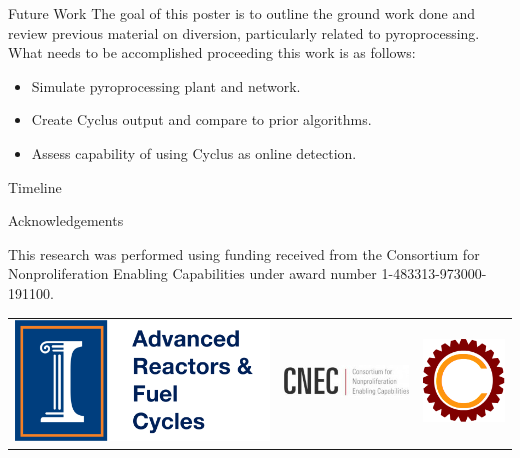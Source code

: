 \documentclass[final]{beamer}
\newlength{\onecolwid}
\newlength{\threecolwid}
\begin{document}
\begin{frame}[t]
\begin{columns}[t,totalwidth=\threecolwid]
\begin{column}{\onecolwid}
\begin{alertblock}{Future Work}
	The goal of this poster is to outline the ground work done and review previous material on diversion, particularly related
	to pyroprocessing. What needs to be accomplished proceeding this work is as follows:
	\begin{itemize}
		\item Simulate pyroprocessing plant and network.
		\item Create Cyclus output and compare to prior algorithms.
		\item Assess capability of using Cyclus as online detection.
	\end{itemize} 

\end{alertblock}


\begin{block}{Timeline}
        
\end{block}





\begin{block}{Acknowledgements}
	
	This research was performed using funding received
	from the Consortium for Nonproliferation Enabling
	Capabilities under award number 1-483313-973000-191100.
	
	\vspace{10mm}
	\begin{center}
		\begin{tabular}{ccc}
			\includegraphics[width=0.3\linewidth]{logo.png} & \includegraphics[width=0.3\linewidth]{cnec_oldlogo.png}
			& \includegraphics[width=0.15\linewidth]{cyclus.png}
		\end{tabular}
	\end{center}
	

\end{block}
\end{column}
\end{columns}
\end{frame}
\end{document}
